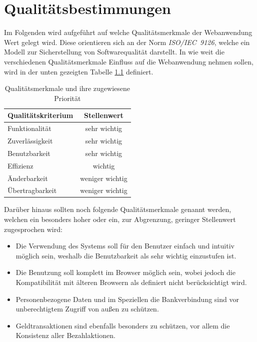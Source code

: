 \documentclass[a4paper]{scrreprt}
\begin{document}
            
            
            
         
\chapter{Qualitätsbestimmungen}
Im Folgenden wird aufgeführt auf welche Qualitätsmerkmale der Webanwendung Wert gelegt wird. Diese orientieren sich an der Norm \textit{ISO/IEC~9126}, welche ein Modell zur Sicherstellung von Softwarequalität darstellt. In wie weit die verschiedenen Qualitätsmerkmale Einfluss auf die Webanwendung nehmen sollen, wird in der unten gezeigten Tabelle \ref{qTabelle} definiert.\\

\begin{table}[h]
 
    \begin{center}
    \begin{tabular}{|l|c|}
    \hline 
    \rule[-1ex]{0pt}{2.5ex} \textbf{Qualitätskriterium} & \textbf{Stellenwert} \\ 
    \hline 
    \rule[-1ex]{0pt}{2.5ex} Funktionalität & sehr wichtig \\ 
    \hline 
    \rule[-1ex]{0pt}{2.5ex} Zuverlässigkeit & sehr wichtig \\ 
    \hline 
    \rule[-1ex]{0pt}{2.5ex} Benutzbarkeit & sehr wichtig \\ 
    \hline 
    \rule[-1ex]{0pt}{2.5ex} Effizienz & wichtig \\ 
    \hline 
    \rule[-1ex]{0pt}{2.5ex} Änderbarkeit & weniger wichtig \\ 
    \hline 
    \rule[-1ex]{0pt}{2.5ex} Übertragbarkeit & weniger wichtig \\ 
    \hline   
    \end{tabular}  
    \end{center}
    \caption{Qualitätsmerkmale und ihre zugewiesene Priorität} 
    \label{qTabelle}   
\end{table}
    
Darüber hinaus sollten noch folgende Qualitätsmerkmale genannt werden, welchen ein besonders hoher oder ein, zur Abgrenzung, geringer Stellenwert zugesprochen wird:
 \begin{itemize}
 	\item Die Verwendung des Systems soll für den Benutzer einfach und intuitiv möglich sein, weshalb die Benutzbarkeit als sehr wichtig einzustufen ist.
 	\item Die Benutzung soll komplett im Browser möglich sein, wobei jedoch die Kompatibilität mit älteren Browsern als definiert nicht berücksichtigt wird.
 	\item Personenbezogene Daten und im Speziellen die Bankverbindung sind vor unberechtigtem Zugriff von außen zu schützen.
 	\item Geldtransaktionen sind ebenfalls besonders zu schützen, vor allem die Konsistenz aller Bezahlaktionen.
 \end{itemize}
 
\end{document}

